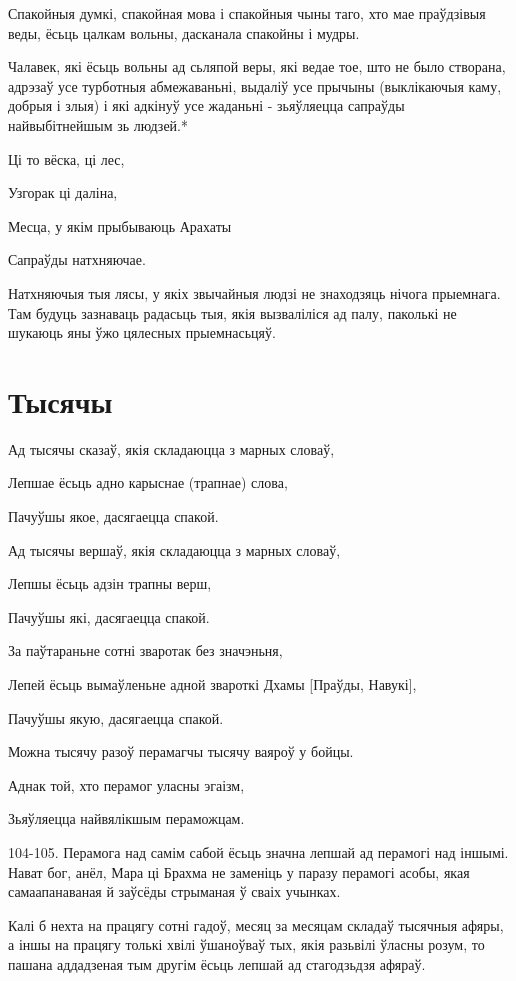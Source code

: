 \documentclass{article}
\begin{document}
Спакойныя думкі, спакойная мова і спакойныя чыны таго, хто мае
праўдзівыя веды, ёсьць цалкам вольны, дасканала спакойны і мудры.

Чалавек, які ёсьць вольны ад сьляпой веры, які ведае тое, што не
было створана, адрэзаў усе турботныя абмежаваньні, выдаліў усе прычыны
(выклікаючыя каму, добрыя і злыя) і які адкінуў усе жаданьні -
зьяўляецца сапраўды найвыбітнейшым зь людзей.*

Ці то вёска, ці лес,

Узгорак ці даліна,

Месца, у якім прыбываюць Арахаты

Сапраўды натхняючае.

Натхняючыя тыя лясы, у якіх звычайныя людзі не знаходзяць нічога
прыемнага. Там будуць зазнаваць радасьць тыя, якія вызваліліся ад палу,
паколькі не шукаюць яны ўжо цялесных прыемнасьцяў.

\section{Тысячы}

Ад тысячы сказаў, якія складаюцца з марных словаў,

Лепшае ёсьць адно карыснае (трапнае) слова,

Пачуўшы якое, дасягаецца спакой.

Ад тысячы вершаў, якія складаюцца з марных словаў,

Лепшы ёсьць адзін трапны верш,

Пачуўшы які, дасягаецца спакой.

За паўтараньне сотні зваротак без значэньня,

Лепей ёсьць вымаўленьне адной звароткі Дхамы {[}Праўды, Навукі{]},

Пачуўшы якую, дасягаецца спакой.

Можна тысячу разоў перамагчы тысячу ваяроў у бойцы.

Аднак той, хто перамог уласны эгаізм,

Зьяўляецца найвялікшым пераможцам.

104-105. Перамога над самім сабой ёсьць значна лепшай ад перамогі над
іншымі. Нават бог, анёл, Мара ці Брахма не заменіць у паразу перамогі
асобы, якая самаапанаваная й заўсёды стрыманая ў сваіх учынках.

Калі б нехта на працягу сотні гадоў, месяц за месяцам складаў
тысячныя афяры, а іншы на працягу толькі хвілі ўшаноўваў тых, якія
разьвілі ўласны розум, то пашана аддадзеная тым другім ёсьць лепшай ад
стагодзьдзя афяраў.
\end{document}
